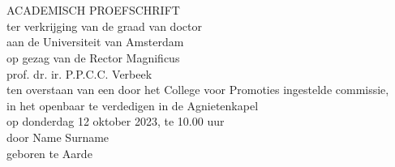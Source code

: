 \begin{titlepage}
    \begin{center}
        \large

        \hfill

        \vfill

        \begingroup
        
            \spacedallcaps{\large{\textbf{\myTitle}}}\\
            \spacedallcaps{\mySubTitle}\\
        \endgroup

        \vfill

        \begingroup
            ACADEMISCH PROEFSCHRIFT\\
            \vspace{3em}
            {\small ter verkrijging van de graad van doctor}\\
            {\small aan de Universiteit van Amsterdam}\\
            {\small op gezag van de Rector Magnificus}\\
            {\small prof. dr. ir. P.P.C.C. Verbeek}\\
            {\small ten overstaan van een door het College voor Promoties ingestelde commissie,}\\
            {\small in het openbaar te verdedigen in de Agnietenkapel}\\
            {\small op donderdag 12 oktober 2023, te 10.00 uur}\\
             \vspace{0.8em}
             \vspace{3em}
            {\small door Name Surname}\\
            {\small geboren te Aarde}\\


\end{center}
\end{titlepage}
